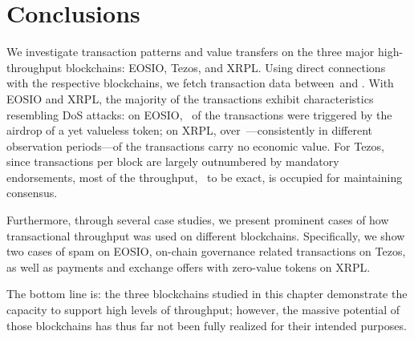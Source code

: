 \section{Conclusions}
\label{sec:conclusion}

We investigate transaction patterns and value transfers on the three major high-throughput blockchains: EOSIO, Tezos, and XRPL. 
Using direct connections with the respective blockchains, we fetch transaction data between~\startdate and \finishdate.
With EOSIO and XRPL, the majority of the transactions exhibit characteristics resembling DoS attacks: on EOSIO,~ of the transactions were triggered by the airdrop of a yet valueless token; on XRPL, over~---consistently in different observation periods---of the transactions carry no economic value. 
For Tezos, since transactions per block are largely outnumbered by mandatory endorsements, most of the throughput,~ to be exact, is occupied for maintaining consensus.

Furthermore, through several case studies, we present prominent cases of how transactional throughput was used on different blockchains.
Specifically, we show two cases of spam on EOSIO, on-chain governance related transactions on Tezos, as well as payments and exchange offers with zero-value tokens on XRPL.

The bottom line is: the three blockchains studied in this chapter demonstrate the capacity to support high levels of throughput; however, the massive potential of those blockchains has thus far not been fully realized for their intended purposes.

